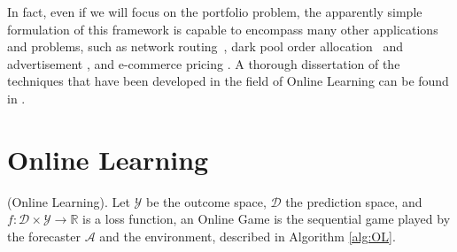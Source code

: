 In fact, even if we will focus on the portfolio problem, the apparently simple formulation of this framework is capable to encompass many other applications and problems, such as network routing~\cite{belmega2018online}, dark pool order allocation~\cite{agarwal2010optimal} and advertisement \cite{gasparini2018targeting}, \cite{nuara2018combinatorial} and  e-commerce  pricing \cite{trovo2015multi} \cite{trovo2018improving}.
A thorough dissertation of the techniques that have been developed in the field of Online Learning can be found in \cite{cesa2006prediction}.

\section{Online Learning}
\label{sec:OnlineLearning}


\begin{definition}(Online Learning).\label{def:OGP}
    Let $\mathcal Y$ be the outcome space, $\mathcal D$ the prediction space, and $f:\mathcal D\times\mathcal Y\to \mathbb R$ is a loss function, an Online Game is the sequential game played by the forecaster $\mathcal A$ and the environment, described in Algorithm \ref{alg:OL}.
\end{definition}

